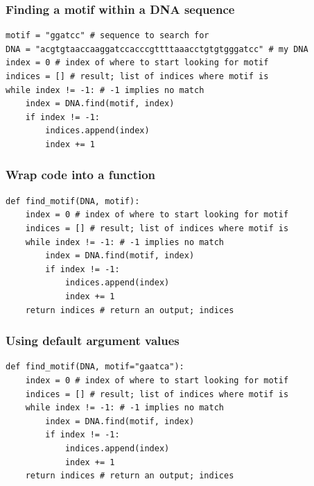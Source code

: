 \documentclass[pdf]{beamer}
\begin{document}
\begin{frame}[fragile]
\frametitle{Finding a motif within a DNA sequence}

\begin{lstlisting}[style=python]
motif = "ggatcc" # sequence to search for
DNA = "acgtgtaaccaaggatccacccgttttaaacctgtgtgggatcc" # my DNA
index = 0 # index of where to start looking for motif
indices = [] # result; list of indices where motif is
while index != -1: # -1 implies no match
    index = DNA.find(motif, index)
    if index != -1:
        indices.append(index)
        index += 1
\end{lstlisting}

\end{frame}

\begin{frame}[fragile]
\frametitle{Wrap code into a function}

\begin{lstlisting}[style=python]
def find_motif(DNA, motif):
    index = 0 # index of where to start looking for motif
    indices = [] # result; list of indices where motif is
    while index != -1: # -1 implies no match
        index = DNA.find(motif, index)
        if index != -1:
            indices.append(index)
            index += 1
    return indices # return an output; indices
\end{lstlisting}

\end{frame}

\begin{frame}[fragile]
\frametitle{Using default argument values}

\begin{lstlisting}[style=python]
def find_motif(DNA, motif="gaatca"):
    index = 0 # index of where to start looking for motif
    indices = [] # result; list of indices where motif is
    while index != -1: # -1 implies no match
        index = DNA.find(motif, index)
        if index != -1:
            indices.append(index)
            index += 1
    return indices # return an output; indices
\end{lstlisting}

\end{frame}
\end{document}
